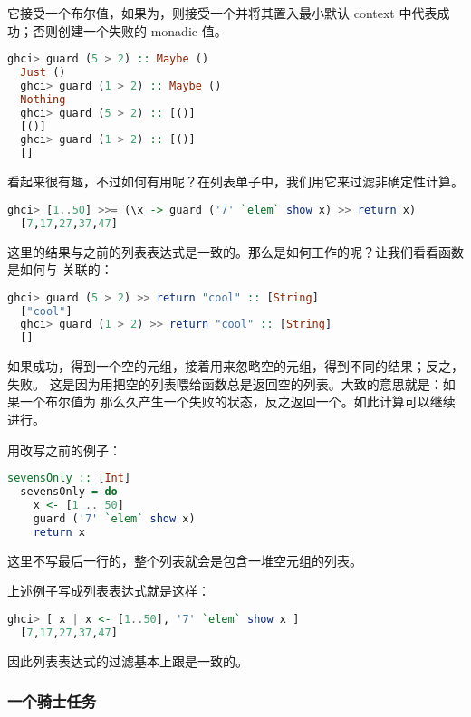 \documentclass[./main.tex]{subfiles}
\begin{document}
它接受一个布尔值，如果为，则接受一个\acode{()}并将其置入最小默认 context 中代表成功；否则创建一个失败的
monadic 值。

\begin{lstlisting}[language=Haskell]
  ghci> guard (5 > 2) :: Maybe ()
  Just ()
  ghci> guard (1 > 2) :: Maybe ()
  Nothing
  ghci> guard (5 > 2) :: [()]
  [()]
  ghci> guard (1 > 2) :: [()]
  []
\end{lstlisting}

看起来很有趣，不过如何有用呢？在列表单子中，我们用它来过滤非确定性计算。

\begin{lstlisting}[language=Haskell]
  ghci> [1..50] >>= (\x -> guard ('7' `elem` show x) >> return x)
  [7,17,27,37,47]
\end{lstlisting}

这里的结果与之前的列表表达式是一致的。那么是如何工作的呢？让我们看看函数是如何与\acode{>>}
关联的：

\begin{lstlisting}[language=Haskell]
  ghci> guard (5 > 2) >> return "cool" :: [String]
  ["cool"]
  ghci> guard (1 > 2) >> return "cool" :: [String]
  []
\end{lstlisting}

如果成功，得到一个空的元组，接着用\acode{>>}来忽略空的元组，得到不同的结果；反之，失败。
这是因为用\acode{>>=}把空的列表喂给函数总是返回空的列表。大致的意思就是：如果一个布尔值为
那么久产生一个失败的状态，反之返回一个\acode{()}。如此计算可以继续进行。

用改写之前的例子：

\begin{lstlisting}[language=Haskell]
  sevensOnly :: [Int]
  sevensOnly = do
    x <- [1 .. 50]
    guard ('7' `elem` show x)
    return x
\end{lstlisting}

这里不写最后一行的，整个列表就会是包含一堆空元组的列表。

上述例子写成列表表达式就是这样：

\begin{lstlisting}[language=Haskell]
  ghci> [ x | x <- [1..50], '7' `elem` show x ]
  [7,17,27,37,47]
\end{lstlisting}

因此列表表达式的过滤基本上跟是一致的。

\subsubsection*{一个骑士任务}
\end{document}
